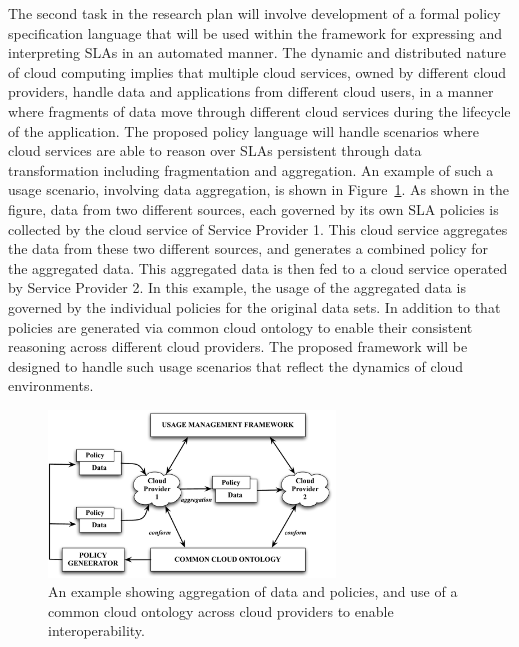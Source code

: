 \documentclass[10pt, conference, compsocconf]{IEEEtran}
\begin{document}
The second task in the research plan will involve development of a formal policy specification language that will be used within the framework for expressing and interpreting SLAs in an automated manner.  The dynamic and distributed nature of cloud computing implies that multiple cloud services, owned by different cloud providers, handle data and applications from different cloud users, in a manner where fragments of data move through different cloud services during the lifecycle of the application. The proposed policy language will handle scenarios where cloud services are able to reason over SLAs persistent through data transformation including fragmentation and aggregation. An example of such a usage scenario, involving data aggregation, is shown in Figure~\ref{fig:dynamics}. As shown in the figure, data from two different sources, each governed by its own SLA  policies is collected by the cloud service of  Service Provider 1. This cloud service aggregates the data from these two different sources, and generates a combined policy for the aggregated data. This aggregated data is then fed to a cloud service operated by Service Provider 2. In this example, the usage of the aggregated data is governed by the individual policies for the original data sets. In addition to that policies are generated via common cloud ontology to enable their consistent reasoning across different cloud providers. The proposed framework will be designed to handle such usage scenarios that reflect the dynamics of cloud environments. 

\begin{figure}[!t]
\centering
\includegraphics[width=3in]{dynamics.pdf}
\caption{An example showing aggregation of data and policies, and use of a common cloud ontology across cloud providers to enable interoperability.}
\label{fig:dynamics}
\end{figure}
\end{document}
